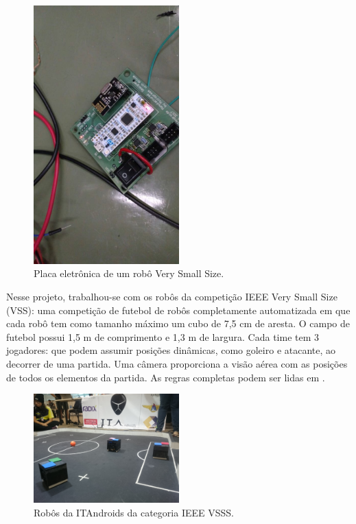 \documentclass[a4paper,12pt]{article}
\begin{document}
\begin{figure}[H]
	\centering
	\includegraphics[width=0.5\textwidth]{figures/vss_ele.jpg}
   \caption{Placa eletrônica de um robô Very Small Size.} \label{fig:vss_ele}
\end{figure}

Nesse projeto, trabalhou-se com os robôs da competição IEEE Very Small Size (VSS): uma competição de futebol de robôs completamente automatizada em que cada robô tem como tamanho máximo um cubo de 7,5 cm de aresta. O campo de futebol possui 1,5 m de comprimento e 1,3 m de largura. Cada time tem 3 jogadores: que podem assumir posições dinâmicas, como goleiro e atacante, ao decorrer de uma partida. Uma câmera proporciona a visão aérea com as posições de todos os elementos da partida. As regras completas podem ser lidas em \cite{cbr2008}.

\begin{figure}[H]
	\centering
	\includegraphics[width=0.5\textwidth]{figures/vss.JPG}
   \caption{Robôs da ITAndroids da categoria IEEE VSSS.} \label{fig:vss}
\end{figure}
\end{document}
